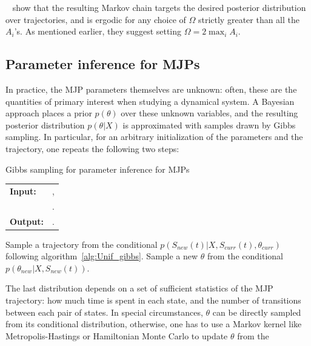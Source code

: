     ~\cite{RaoTeh13} show that the resulting Markov chain targets
    the desired posterior distribution over trajectories, and is 
    ergodic for any choice of $\Omega$ strictly greater than all the
    $A_i$'s. As mentioned earlier, they suggest setting $\Omega = 2\max_i A_i$.

\subsection{Parameter inference for MJPs}
In practice, the MJP parameters themselves are unknown: often,
these are the quantities of primary interest when studying a dynamical
system. A Bayesian approach
places a prior $p(\theta)$ over these unknown variables, and the
resulting posterior distribution $p(\theta|X)$ is approximated
with samples drawn by Gibbs sampling. In particular, for an arbitrary 
initialization of the parameters and the trajectory, one repeats the
following two steps:
\begin{algorithm}[H]
  \caption{Gibbs sampling for parameter inference for MJPs}
   \label{alg:MJP_gibbs}
  \begin{tabular}{l l}
   \textbf{Input:  } & \text{A set of partial and noisy observations $X$}, \\
                      & \text{The previous MJP path $S(t) = (S, T)$, the previous MJP parameters $\theta$}.\\ 
   \textbf{Output:  }& \text{A new MJP trajectory $\tilde{S} (t) = (\tilde{S}, \tilde{T})$, 
                            new MJP parameters $\tilde{\theta}$}.\\
   \hline
   \end{tabular}
   \begin{algorithmic}[1]
  \State  Sample a trajectory from the conditional 
  $p(S_{new}(t)|X,S_{curr}(t),\theta_{curr})$ following 
  algorithm~\ref{alg:Unif_gibbs}.
  \State Sample a new $\theta$ from the conditional 
    $p(\theta_{new}|X,S_{new}(t))$.
   \end{algorithmic}
\end{algorithm}
The last distribution depends on a set of sufficient statistics of the 
MJP trajectory: how
much time is spent in each state, and the number of transitions
between each pair of states. 
In special circumstances, $\theta$ can be directly sampled from its 
conditional distribution, otherwise, one has to use a Markov kernel like
Metropolis-Hastings or Hamiltonian Monte Carlo to update $\theta$ from the
